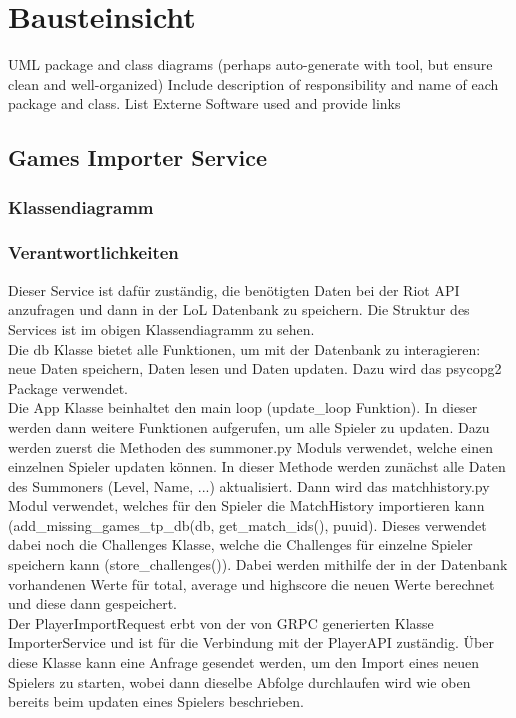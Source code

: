 \section{Bausteinsicht}
UML package and class diagrams (perhaps auto-generate with tool, but ensure clean and well-organized)
Include description of responsibility and name of each package and class.
List Externe Software used and provide links


\subsection{Games Importer Service}
\subsubsection{Klassendiagramm}
\subsubsection{Verantwortlichkeiten}
Dieser Service ist dafür zuständig, die benötigten Daten bei der Riot API anzufragen und dann in der LoL Datenbank zu speichern. Die Struktur des Services ist im obigen Klassendiagramm zu sehen. \\
Die db Klasse bietet alle Funktionen, um mit der Datenbank zu interagieren: neue Daten speichern, Daten lesen und Daten updaten. Dazu wird das psycopg2 Package verwendet.\\
Die App Klasse beinhaltet den main loop (update\_loop Funktion). In dieser werden dann weitere Funktionen aufgerufen, um alle Spieler zu updaten. Dazu werden zuerst die Methoden des summoner.py Moduls verwendet, welche einen einzelnen Spieler updaten können. In dieser Methode werden zunächst alle Daten des Summoners (Level, Name, ...) aktualisiert. Dann wird das matchhistory.py Modul verwendet, welches für den Spieler die MatchHistory importieren kann (add\_missing\_games\_tp\_db(db, get\_match\_ids(), puuid). Dieses verwendet dabei noch die Challenges Klasse, welche die Challenges für einzelne Spieler speichern kann (store\_challenges()). Dabei werden mithilfe der in der Datenbank vorhandenen Werte für total, average und highscore die neuen Werte berechnet und diese dann gespeichert.\\

Der PlayerImportRequest erbt von der von GRPC generierten Klasse ImporterService und ist für die Verbindung mit der PlayerAPI zuständig. Über diese Klasse kann eine Anfrage gesendet werden, um den Import eines neuen Spielers zu starten, wobei dann dieselbe Abfolge durchlaufen wird wie oben bereits beim updaten eines Spielers beschrieben.

